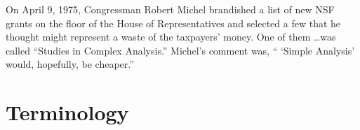 \documentclass{homework}
\author{Alex Li}
\begin{document}
\maketitle

\begin{inspiration}
  On April 9, 1975, Congressman Robert Michel brandished a list of new
    NSF grants on the floor of the House of Representatives and selected
      a few that he thought might represent a waste of the taxpayers'
        money. One of them \ldots was called ``Studies in Complex
          Analysis.'' Michel's comment was, `` `Simple Analysis' would,
            hopefully, be cheaper.''
              \end{inspiration}

              \section{Terminology}
\end{document}
